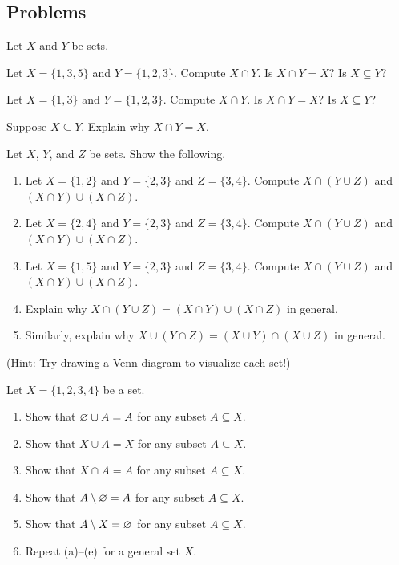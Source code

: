 \documentclass[../notes.tex]{subfiles}
\begin{document}
\subsection{Problems}
\begin{homework}
    Let $X$ and $Y$ be sets.
    \begin{listalph}
        \item Let $X=\{1,3,5\}$ and $Y=\{1,2,3\}$. Compute $X\cap Y$. Is $X\cap Y=X$? Is $X\subseteq Y$?
        \item Let $X=\{1,3\}$ and $Y=\{1,2,3\}$. Compute $X\cap Y$. Is $X\cap Y=X$? Is $X\subseteq Y$?
        \item Suppose $X\subseteq Y$. Explain why $X\cap Y=X$.
    \end{listalph}
\end{homework}
\begin{homework}
    Let $X$, $Y$, and $Z$ be sets. Show the following.
    \begin{enumerate}[label=(\alph*)]
        \item Let $X=\{1,2\}$ and $Y=\{2,3\}$ and $Z=\{3,4\}$. Compute $X\cap (Y\cup Z)$ and $(X\cap Y)\cup(X\cap Z)$.
        \item Let $X=\{2,4\}$ and $Y=\{2,3\}$ and $Z=\{3,4\}$. Compute $X\cap (Y\cup Z)$ and $(X\cap Y)\cup(X\cap Z)$.
        \item Let $X=\{1,5\}$ and $Y=\{2,3\}$ and $Z=\{3,4\}$. Compute $X\cap (Y\cup Z)$ and $(X\cap Y)\cup(X\cap Z)$.
        \item Explain why $X \cap (Y \cup Z) = (X \cap Y) \cup (X \cap Z)$ in general.
        \item Similarly, explain why $X \cup (Y \cap Z) = (X \cup Y) \cap (X \cup Z)$ in general.
    \end{enumerate}
    (Hint: Try drawing a Venn diagram to visualize each set!)
\end{homework}
\begin{homework}
    Let $X=\{1,2,3,4\}$ be a set.
    \begin{enumerate}[label=(\alph*)]
        \item Show that $\varnothing\cup A=A$ for any subset $A\subseteq X$.
        \item Show that $X\cup A=X$ for any subset $A\subseteq X$.
        \item Show that $X\cap A=A$ for any subset $A\subseteq X$.
        \item Show that $A\setminus\varnothing=A$ for any subset $A\subseteq X$.
        \item Show that $A\setminus X=\varnothing$ for any subset $A\subseteq X$.
        \item Repeat (a)--(e) for a general set $X$.
    \end{enumerate}
\end{homework}
\end{document}

